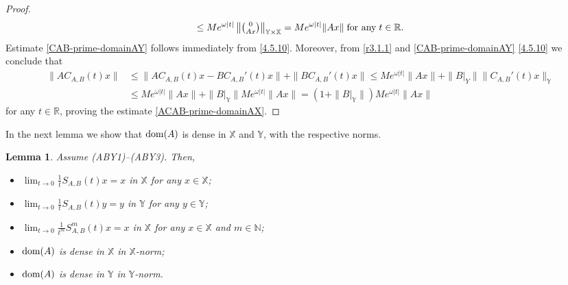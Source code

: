 \documentclass[11pt]{amsart}
\numberwithin{equation}{section}
\newcommand{\SAB}{S_{A,B}}
\newcommand{\CAB}{C_{A,B}}
\newcommand{\NN}{{\mathbb N}}
\newtheorem{lemma}[theorem]{Lemma}
\theoremstyle{remark}
\theoremstyle{definition}
\newcommand\bX{{\mathbb X}}
\newcommand\bY{{\mathbb Y}}
\newcommand{\dom}{\text{\rm{dom}}}
\begin{document}
\begin{proof}
\begin{align}
		\leq Me^{\omega|t|}\left\|\tbinom{0}{Ax}\right\|_{\bY\times\bX}
		= Me^{\omega|t|}\|Ax\|\;\mbox{for any}\; t \in \mathbb{R}.	
\end{align}
Estimate \eqref{CAB-prime-domainAY} follows immediately from \eqref{4.5.10}. Moreover, from \eqref{r3.1.1} and  \eqref{CAB-prime-domainAY} \eqref{4.5.10} we conclude that 
\begin{align}\label{4.5.11}
		\|A\CAB(t)x\|
		&\leq \|A\CAB(t)x - BC_{A,B}'(t)x\| + \|BC_{A,B}'(t)x\| \leq Me^{\omega|t|}\|Ax\| + \|B|_Y\|\|C_{A,B}'(t)x\|_\bY \nonumber\\
		&\leq Me^{\omega|t|}\|Ax\| + \|B|_\bY\|Me^{\omega|t|}\|Ax\|
		= (1+\|B|_\bY\|)Me^{\omega|t|}\|Ax\|
	\end{align}
	for any $t \in \mathbb{R}$, proving the estimate \eqref{ACAB-prime-domainAX}.
\end{proof}	
In the next lemma we show that $\dom(A)$ is dense in $\bX$ and $\bY$, with the respective norms. 
\begin{lemma}\label{l4.6}
	Assume \textnormal{(ABY1)--(ABY3)}. Then,
	\begin{itemize}
		\item[(i)] $\displaystyle\lim_{t \to 0} \frac{1}{t} \SAB(t)x = x$ in $\bX$ for any $x \in \bX$;
		\item[(ii)] $\displaystyle\lim_{t \to 0} \frac{1}{t} \SAB(t)y = y$ in $\bY$ for any $y \in \bY$;
		\item[(iii)] $\displaystyle\lim_{t \to 0} \frac{1}{t^m} \SAB^m(t)x = x$ in $\bX$ for any $x \in \bX$ and $m\in\NN$;
		\item[(iv)] $\dom(A)$ is dense in $\bX$ in $\bX$-norm;
		\item[(v)] $\dom(A)$ is dense in $\bY$ in $\bY$-norm.
	\end{itemize}
\end{lemma}
\end{document}
